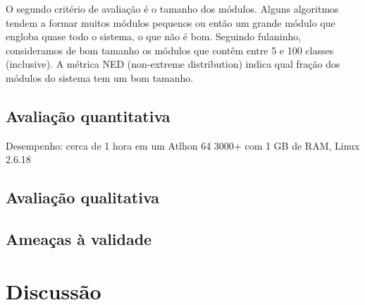 O segundo critério de avaliação é o tamanho dos módulos. Alguns algoritmos
tendem a formar muitos módulos pequenos ou então um grande módulo que engloba
quase todo o sistema, o que não é bom. 
Seguindo fulaninho, consideramos de bom tamanho os módulos que contêm
entre 5 e 100 classes (inclusive). A métrica NED (non-extreme distribution)
indica qual fração dos módulos do sistema tem um bom tamanho.

\subsection{Avaliação quantitativa}

Desempenho: cerca de 1 hora em um Atlhon 64 3000+ com 1 GB de RAM, Linux 2.6.18


\subsection{Avaliação qualitativa}

\subsection{Ameaças à validade}




\section{Discussão}
